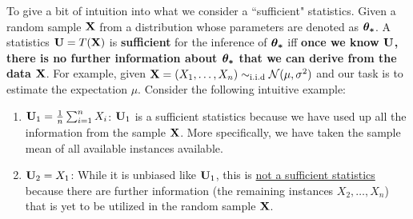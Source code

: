 \begin{remark}
    To give a bit of intuition into what we consider a ``sufficient" statistics. Given a random sample ${\bf X}$ from a distribution whose parameters are denoted as $\boldsymbol{\theta_*}$. A statistics ${\bf U}=T({\bf X})$ is \textbf{sufficient} for the inference of $\boldsymbol{\theta_*}$ iff \textbf{once we know ${\bf U}$, there is no further information about $\boldsymbol{\theta_*}$ that we can derive from the data ${\bf X}$}. For example, given ${\bf X}=(X_1, \dots, X_n) \sim_\mathrm{i.i.d}\mathcal{N}(\mu, \sigma^2)$ and our task is to estimate the expectation $\mu$. Consider the following intuitive example:
    \begin{enumerate}[label=(\roman*)]
        \item ${\bf U}_1 = \frac{1}{n}\sum_{i=1}^n X_i$: ${\bf U}_1$ is a sufficient statistics because we have used up all the information from the sample ${\bf X}$. More specifically, we have taken the sample mean of all available instances available. 
        \item ${\bf U}_2 = X_1$: While it is unbiased like ${\bf U}_1$, this is \underline{not a sufficient statistics} because there are further information (the remaining instances $X_2, \dots, X_n$) that is yet to be utilized in the random sample ${\bf X}$.
    \end{enumerate} 
\end{remark} 

